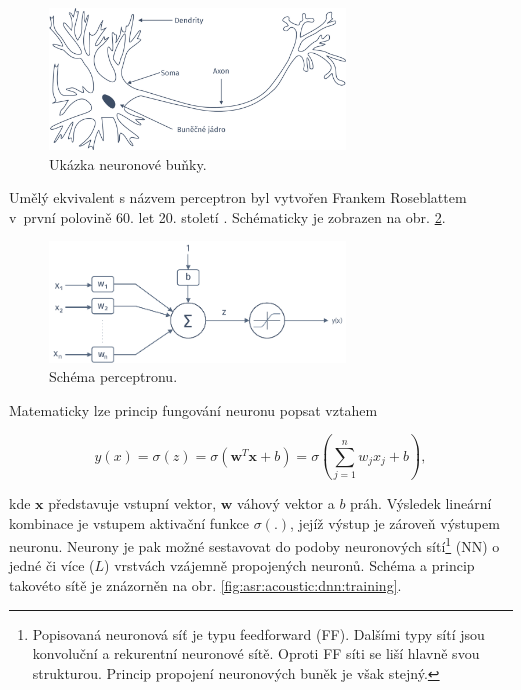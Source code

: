 \begin{figure}[hbpt]
  \centering
  \includegraphics[width=0.7\textwidth]{./ch4-asr/img/neuron-human.pdf}
  \caption{Ukázka neuronové buňky.}
  \label{fig:asr:acoustic:dnn:neuron:human}
\end{figure}

\noindent Umělý ekvivalent s názvem perceptron byl vytvořen Frankem Roseblattem v~první polovině 60. let 20. století \cite{Rosenblatt1962}. Schématicky je zobrazen na obr. \ref{fig:asr:acoustic:dnn:neuron:artificial}.

\begin{figure}[hbpt]
  \centering
  \includegraphics[width=0.7\textwidth]{./ch4-asr/img/neuron.pdf}
  \caption{Schéma perceptronu.}
  \label{fig:asr:acoustic:dnn:neuron:artificial}
\end{figure}

\noindent Matematicky lze princip fungování neuronu popsat vztahem

\begin{equation}
  y\left(x\right) = \sigma\left(z\right) = \sigma \left(\boldsymbol{w}^{T}\boldsymbol{x} + b\right) = \sigma \left( \sum_{j=1}^{n} w_{j}x_{j} + b\right),
   \label{eq:asr:acoustic:dnn:neuron:output}
 \end{equation}

\noindent kde $\boldsymbol{x}$ představuje vstupní vektor, $\boldsymbol{w}$ váhový vektor a $b$ práh. Výsledek lineární kombinace je vstupem aktivační funkce $\sigma\left(.\right)$, jejíž výstup je zároveň výstupem neuronu. Neurony je pak možné sestavovat do podoby neuronových sítí\footnote{Popisovaná neuronová síť je typu feedforward (FF). Dalšími typy sítí jsou konvoluční a rekurentní neuronové sítě. Oproti FF síti se liší hlavně svou strukturou. Princip propojení neuronových buněk je však stejný.} (NN) o jedné či více ($L$) vrstvách vzájemně propojených neuronů. Schéma a princip takovéto sítě je znázorněn na obr. \ref{fig:asr:acoustic:dnn:training}.

